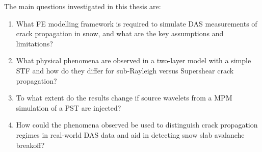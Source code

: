   The main questions investigated in this thesis are: 
  \begin{enumerate}
    \item What FE modelling framework is required to simulate DAS measurements of crack propagation in snow, and what are the key assumptions and limitations?
    \item What physical phenomena are observed in a two-layer model with a simple STF and how do they differ for sub-Rayleigh versus Supershear crack propagation?
    \item To what extent do the results change if source wavelets from a MPM simulation of a PST are injected?
    \item How could the phenomena observed be used to distinguish crack propagation regimes in real-world DAS data and aid in detecting snow slab avalanche breakoff?
  \end{enumerate}



